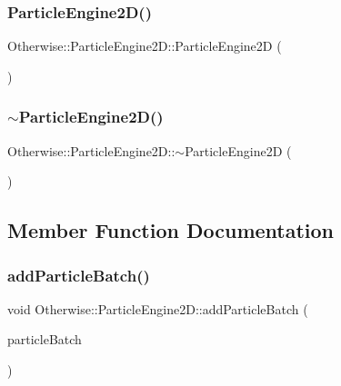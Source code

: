 \subsubsection{\texorpdfstring{Particle\+Engine2\+D()}{ParticleEngine2D()}}
{\footnotesize\ttfamily Otherwise\+::\+Particle\+Engine2\+D\+::\+Particle\+Engine2D (\begin{DoxyParamCaption}{ }\end{DoxyParamCaption})}

\mbox{\label{class_otherwise_1_1_particle_engine2_d_a268b109e44f399b79c4bd70e16f11946}} 
\subsubsection{\texorpdfstring{$\sim$\+Particle\+Engine2\+D()}{~ParticleEngine2D()}}
{\footnotesize\ttfamily Otherwise\+::\+Particle\+Engine2\+D\+::$\sim$\+Particle\+Engine2D (\begin{DoxyParamCaption}{ }\end{DoxyParamCaption})}



\subsection{Member Function Documentation}
\mbox{\label{class_otherwise_1_1_particle_engine2_d_a13f9168fb8f0dcd67adcf5252faf4332}} 
\subsubsection{\texorpdfstring{add\+Particle\+Batch()}{addParticleBatch()}}
{\footnotesize\ttfamily void Otherwise\+::\+Particle\+Engine2\+D\+::add\+Particle\+Batch (\begin{DoxyParamCaption}\item[{\hyperlink{class_otherwise_1_1_particle_batch2_d}{Particle\+Batch2D} $\ast$}]{particle\+Batch }\end{DoxyParamCaption})}


